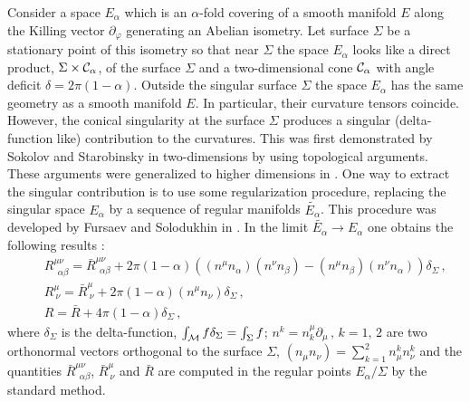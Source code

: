 \documentclass[12pt]{article}
\begin{document}
Consider a space $E_\alpha$ which is an $\alpha$-fold covering of
a smooth manifold $E$ along the Killing vector $\partial_\varphi$
generating an
Abelian isometry. Let  surface $\Sigma$ be a stationary point of
this isometry so that  near $\Sigma$  the space $E_\alpha$ looks like a direct
product,  $\Sigma \times {\cal C}_\alpha$, of the surface $\Sigma$
and a
two-dimensional cone ${\cal C}_\alpha$ with angle deficit $\delta=
2\pi(1-\alpha)$.  Outside the singular surface $\Sigma$ the space
$E_\alpha$ has the same geometry as a  smooth manifold $E$.
In particular, their curvature tensors  coincide.  However, the conical singularity at the
surface $\Sigma$ produces a
 singular (delta-function like) contribution to the curvatures. This was first demonstrated  by Sokolov and Starobinsky \cite{Solokov-Starobinsky} in  two-dimensions  by using  topological arguments. These arguments were generalized to higher dimensions  in \cite{Banados:1993qp}. One way to
extract
the singular contribution  is to use some regularization
procedure,
replacing the singular space $E_\alpha$ by  a sequence  of
regular
manifolds $\tilde{E_\alpha}$.  This procedure was developed by Fursaev and Solodukhin in \cite{Fursaev:1995ef}. In the limit  $\tilde{E_\alpha}
\rightarrow
E_\alpha$ one obtains the following results \cite{Fursaev:1995ef}:
\begin{eqnarray}
&&R^{\mu\nu}_{\ \ \alpha\beta} = \bar{R}^{\mu\nu}_{\ \
\alpha\beta}+
2\pi (1-\alpha) \left( (n^\mu n_\alpha)(n^\nu n_\beta)- (n^\mu
n_\beta)
(n^\nu n_\alpha) \right) \delta_\Sigma \, ,\nonumber \\
&&R^{\mu}_{ \ \nu} = \bar{R}^{\mu}_{ \ \nu}+2\pi(1-\alpha)(n^\mu
n_\nu)
\delta_\Sigma \, , \nonumber                            \\
&&R = \bar{R}+4\pi(1-\alpha) \delta_\Sigma\, ,
\label{singular curvature}
\end{eqnarray}
where $\delta_\Sigma$ is the delta-function, $\int_{\cal M}^{}f
\delta_\Sigma=
\int_{\Sigma}^{}f$; $n^k=n^\mu_k\partial_\mu\, , \, k=1,\, 2$ are two orthonormal
vectors
orthogonal to the surface $\Sigma$, $(n_\mu n_\nu)=\sum_{k=1}^{2}n^k_\mu
n^k_\nu$
and the quantities $\bar{R}^{\mu\nu}_{\ \ \alpha\beta}$,
$\bar{R}^{\mu}_{ \
\nu}$ and $\bar{R}$
are computed in the regular points $E_{\alpha}/\Sigma$ by the
standard method.
\end{document}
